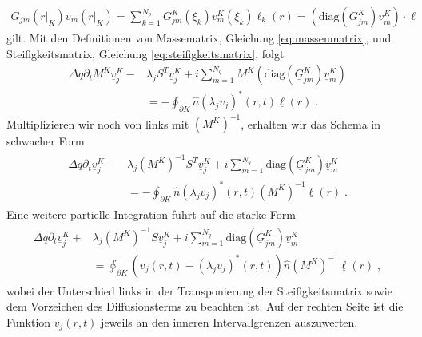 \begin{align}
  G_{jm}(r|_K)v_m(r|_K)  = \sum_{k=1}^{N_p} G_{jm}^K(\xi_k)v_m^K(\xi_k) \ell_k(r) = \left(\text{diag}(\underline{G}_{jm}^K) \underline{v}_m^K\right) \cdot \underline{ \ell }
\end{align}
gilt. Mit den Definitionen von Massematrix, Gleichung \eqref{eq:massenmatrix}, und Steifigkeitsmatrix, Gleichung \eqref{eq:steifigkeitsmatrix}, folgt
\begin{align*}
  \Delta q \partial_t M^K \underline{v}_j^K - &\lambda_j S^T\underline{v}_j^K + i\sum_{m=1}^{N_q} M^K \left(\text{diag}(\underline{G}_{jm}^K) \underline{v}_m^K\right) \\
  &= - \oint_{\partial K}  \hat{n} (\lambda_j v_j)^*(r,t)\underline{\ell}(r) \; .
\end{align*}
Multiplizieren wir noch von links mit $(M^K)^{-1}$, erhalten wir das Schema in schwacher Form
\begin{gather}
\begin{align}
  \Delta q \partial_t \underline{v}_j^K - &\lambda_j (M^K)^{-1}S^T\underline{v}_j^K + i\sum_{m=1}^{N_q} \text{diag}(\underline{G}_{jm}^K) \underline{v}_m^K \\
  &= - \oint_{\partial K}  \hat{n} (\lambda_j v_j)^*(r,t) (M^K)^{-1}\underline{\ell}(r) \; .
\end{align}
\end{gather}
Eine weitere partielle Integration führt auf die starke Form
\begin{gather}
\begin{align}
  \Delta q \partial_t \underline{v}_j^K + &\lambda_j (M^K)^{-1}S\underline{v}_j^K + i\sum_{m=1}^{N_q} \text{diag}(\underline{G}_{jm}^K) \underline{v}_m^K \\
  &=  \oint_{\partial K}  (v_j(r,t) - (\lambda_j v_j)^*(r,t)) \hat{n}  (M^K)^{-1}\underline{\ell}(r) \; ,
\end{align}
\end{gather}
wobei der Unterschied links in der Transponierung der Steifigkeitsmatrix sowie dem Vorzeichen des Diffusionsterms zu beachten ist. Auf der rechten Seite ist die Funktion $v_j(r,t)$ jeweils an den inneren Intervallgrenzen auszuwerten.


